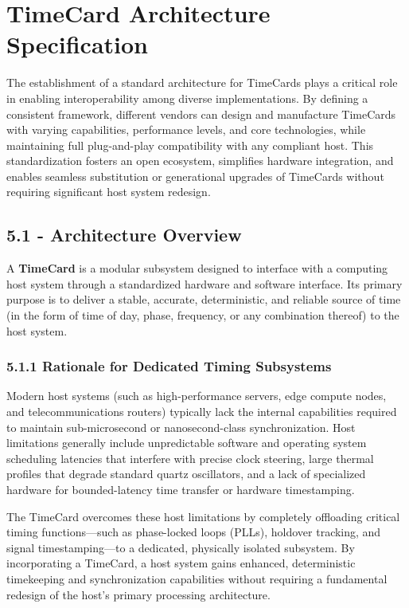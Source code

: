 \section{TimeCard Architecture
Specification}\label{timecard-architecture-specification}

The establishment of a standard architecture for TimeCards plays a
critical role in enabling interoperability among diverse
implementations. By defining a consistent framework, different vendors
can design and manufacture TimeCards with varying capabilities,
performance levels, and core technologies, while maintaining full
plug-and-play compatibility with any compliant host. This
standardization fosters an open ecosystem, simplifies hardware
integration, and enables seamless substitution or generational upgrades
of TimeCards without requiring significant host system redesign.

\subsection{5.1 - Architecture Overview}\label{architecture-overview}

A \textbf{TimeCard} is a modular subsystem designed to interface with a
computing host system through a standardized hardware and software
interface. Its primary purpose is to deliver a stable, accurate,
deterministic, and reliable source of time (in the form of time of day,
phase, frequency, or any combination thereof) to the host system.

\subsubsection{5.1.1 Rationale for Dedicated Timing
Subsystems}\label{rationale-for-dedicated-timing-subsystems}

Modern host systems (such as high-performance servers, edge compute
nodes, and telecommunications routers) typically lack the internal
capabilities required to maintain sub-microsecond or nanosecond-class
synchronization. Host limitations generally include unpredictable
software and operating system scheduling latencies that interfere with
precise clock steering, large thermal profiles that degrade standard
quartz oscillators, and a lack of specialized hardware for
bounded-latency time transfer or hardware timestamping.

The TimeCard overcomes these host limitations by completely offloading
critical timing functions---such as phase-locked loops (PLLs), holdover
tracking, and signal timestamping---to a dedicated, physically isolated
subsystem. By incorporating a TimeCard, a host system gains enhanced,
deterministic timekeeping and synchronization capabilities without
requiring a fundamental redesign of the host's primary processing
architecture.

